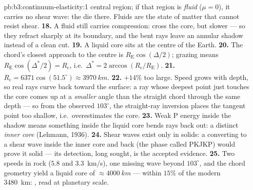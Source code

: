 \begin{solution}{pb:b3:continuum-elasticity:1}
central region; if that region is \emph{fluid} ($\mu = 0$), it carries
no shear wave: the  die there. Fluids are the state of matter
that cannot resist shear.
\textbf{18.} A fluid still carries compression:  cross the
core, but slower --- so they refract sharply at its boundary, and the
bent rays leave an annular shadow instead of a clean cut.
\textbf{19.} A liquid core sits at the centre of the Earth.
\textbf{20.} The chord's closest approach to the centre is
$R_{\text{E}}\cos(\Delta/2)$; grazing means
$R_{\text{E}}\cos(\Delta^*/2) = R_{\text{c}}$, i.e.\ $\Delta^* =
2\arccos(R_{\text{c}}/R_{\text{E}})$.
\textbf{21.} $R_{\text{c}} = 6371\cos(51.5^\circ) \approx
\qty{3970}{km}$.
\textbf{22.} $+14\%$ too large. Speed grows with depth, so real rays
curve back toward the surface: a ray whose deepest point just touches
the core comes up at a \emph{smaller} angle than the straight chord
through the same depth --- so from the observed $103^\circ$, the
straight-ray inversion places the tangent point too shallow, i.e.\
overestimates the core.
\textbf{23.} Weak P energy inside the shadow means something inside
the liquid core bends rays back out: a distinct \emph{inner core}
(Lehmann, 1936).
\textbf{24.} Shear waves exist only in solids: a  converting to
a shear wave inside the inner core and back (the phase called PKJKP)
would prove it solid --- its detection, long sought, is the accepted
evidence.
\textbf{25.} Two speeds in rock ($5.8$ and \qty{3.3}{km/s}), one
missing wave beyond $103^\circ$, and the chord geometry yield a liquid
core of $\approx\qty{4000}{km}$ --- within $15\%$ of the modern
\qty{3480}{km}: , read at planetary scale.
\end{solution}
